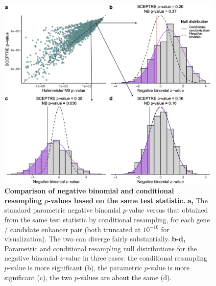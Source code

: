 \documentclass{nature}
\begin{document}
\clearpage

\thispagestyle{empty} 
\begin{figure}[h!]
	\includegraphics[width = \textwidth]{figures/FigureS2/FigureS2.png}
	\caption{\textbf{Comparison of negative binomial and conditional resampling $p$-values based on the same test statistic.} \textbf{a,} The standard parametric negative binomial $p$-value versus that obtained from the same test statistic by conditional resampling, for each gene / candidate enhancer pair (both truncated at $10^{-10}$ for visualization). The two can diverge fairly substantially. \textbf{b-d,} Parametric and conditional resampling null distributions for the negative binomial $z$-value in three cases: the conditional resampling $p$-value is more significant (b), the parametric $p$-value is more significant (c), the two $p$-values are about the same (d).}
	\label{fig:NB-vs-CP}
 \end{figure}
\end{document}
